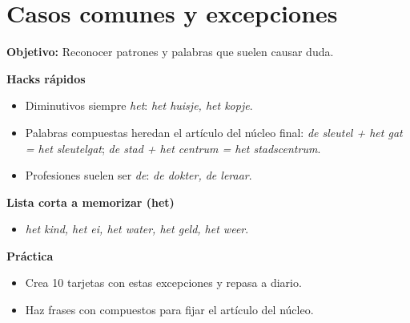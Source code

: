 \section{Casos comunes y excepciones}
\textbf{Objetivo:} Reconocer patrones y palabras que suelen causar duda.

\textbf{Hacks rápidos}
\begin{itemize}[leftmargin=*]
  \item Diminutivos siempre \textit{het}: \textit{het huisje, het kopje}.
  \item Palabras compuestas heredan el artículo del núcleo final: \textit{de sleutel + het gat = het sleutelgat}; \textit{de stad + het centrum = het stadscentrum}.
  \item Profesiones suelen ser \textit{de}: \textit{de dokter, de leraar}.
\end{itemize}

\textbf{Lista corta a memorizar (het)}
\begin{itemize}[leftmargin=*]
  \item \textit{het kind, het ei, het water, het geld, het weer}.
\end{itemize}

\textbf{Práctica}
\begin{itemize}[leftmargin=*]
  \item Crea 10 tarjetas con estas excepciones y repasa a diario.
  \item Haz frases con compuestos para fijar el artículo del núcleo.
\end{itemize}
